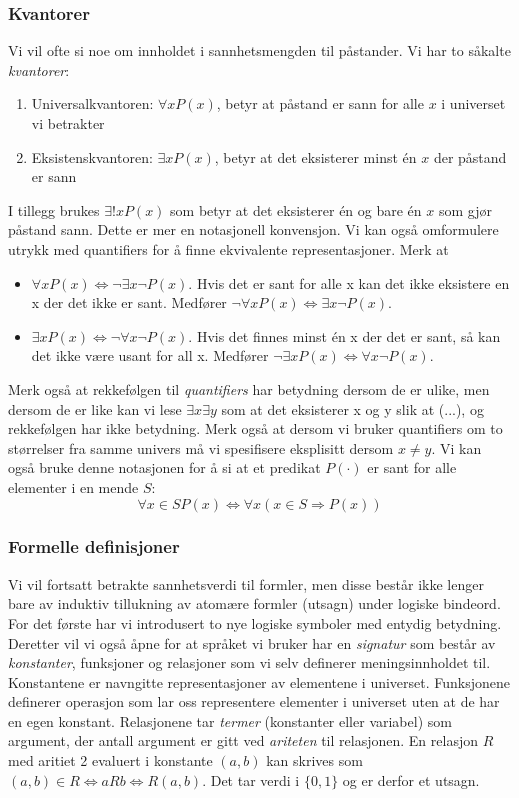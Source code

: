 \subsubsection{Kvantorer}
Vi vil ofte si noe om innholdet i sannhetsmengden til påstander. Vi har to såkalte \textit{kvantorer}:
\begin{enumerate}
\item Universalkvantoren: $\forall x P(x)$, betyr at påstand er sann for alle $x$ i universet vi betrakter
\item Eksistenskvantoren: $\exists x P(x)$, betyr at det eksisterer minst én $x$ der påstand er sann
\end{enumerate}
I tillegg brukes $\exists! x P(x)$ som betyr at det eksisterer én og bare én $x$ som gjør påstand sann. Dette er mer en notasjonell konvensjon. Vi kan også omformulere utrykk med quantifiers for å finne ekvivalente representasjoner. Merk at
\begin{itemize}
\item $\forall x P(x) \Leftrightarrow \neg \exists x \neg P(x)$. Hvis det er sant for alle x kan det ikke eksistere en x der det ikke er sant. Medfører $\neg \forall x P(x) \Leftrightarrow \exists x \neg P(x)$.
\item $\exists x P(x) \Leftrightarrow \neg \forall x \neg P(x)$. Hvis det finnes minst én x der det er sant, så kan det ikke være usant for all x. Medfører $\neg \exists x P(x) \Leftrightarrow \forall x \neg P(x)$. 
\end{itemize}
Merk også at rekkefølgen til \textit{quantifiers} har betydning dersom de er ulike, men dersom de er like kan vi lese $\exists x \exists y$ som at det eksisterer x og y slik at (...), og rekkefølgen har ikke betydning. Merk også at dersom vi bruker quantifiers om to størrelser fra samme univers må vi spesifisere eksplisitt dersom $x \neq y$. Vi kan også bruke denne notasjonen for å si at et predikat $P(\cdot)$ er sant for alle elementer i en mende $S$:
$$
\forall x \in S P(x) \Leftrightarrow \forall x (x\in S \Rightarrow P(x))
$$
\subsubsection{Formelle definisjoner}
Vi vil fortsatt betrakte sannhetsverdi til formler, men disse består ikke lenger bare av induktiv tillukning av atomære formler (utsagn) under logiske bindeord. For det første har vi introdusert to nye logiske symboler med entydig betydning. Deretter vil vi også åpne for at språket vi bruker har en \textit{signatur} som består av \textit{konstanter}, funksjoner og relasjoner som vi selv definerer meningsinnholdet til. Konstantene er navngitte representasjoner av elementene i universet. Funksjonene definerer operasjon som lar oss representere elementer i universet uten at de har en egen konstant. Relasjonene tar \textit{termer} (konstanter eller variabel) som argument, der antall argument er gitt ved \textit{ariteten} til relasjonen. En relasjon $R$ med aritiet 2 evaluert i konstante $(a,b)$ kan skrives som $(a,b)\in R \iff aRb \iff R(a,b)$. Det tar verdi i $\{0,1\}$ og er derfor et utsagn. 

